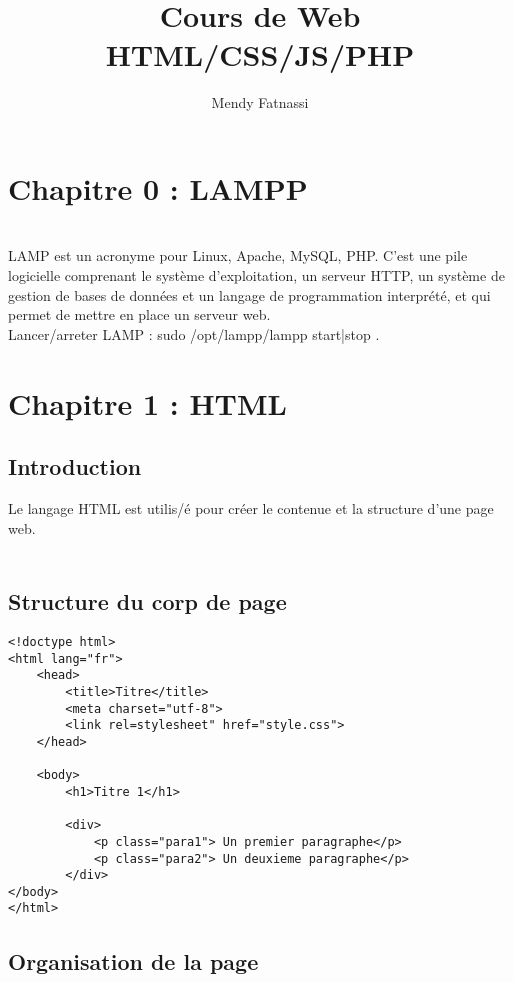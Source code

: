\documentclass[a4paper,12pt]{book}
\author{Mendy Fatnassi}
\title{Cours de Web HTML/CSS/JS/PHP}
\begin{document}
\maketitle

\chapter{Chapitre 0 : LAMPP}
\\
LAMP est un acronyme pour Linux, Apache, MySQL, PHP. C'est une pile logicielle comprenant le système d'exploitation, un serveur HTTP, un système de gestion de bases de données et un langage de programmation interprété, et qui permet de mettre en place un serveur web.\\
Lancer/arreter LAMP : sudo /opt/lampp/lampp {start|stop} .\\

\chapter{Chapitre 1 : HTML}

\section{Introduction}

Le langage HTML est utilis/é pour créer le contenue et la structure d'une page web.\\
\\
\section{Structure du corp de page}

\begin{DDbox}{\linewidth}
\begin{lstlisting}
<!doctype html>
<html lang="fr">
	<head>
		<title>Titre</title>
		<meta charset="utf-8">
		<link rel=stylesheet" href="style.css">
	</head>

	<body>
		<h1>Titre 1</h1>

		<div>
			<p class="para1"> Un premier paragraphe</p>
			<p class="para2"> Un deuxieme paragraphe</p>
		</div>	
</body>
</html>
\end{lstlisting}
\end{DDbox}{\linewidth}



\section{Organisation de la page}
\end{document}
